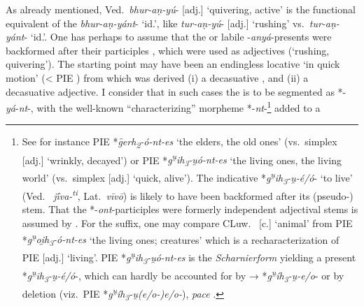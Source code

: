 \documentclass[output=paper,colorlinks,citecolor=brown]{langscibook}
\begin{document}
As already mentioned, Ved.\ \textit{bhur-aṇ-yú}-  [adj.] ‘quivering, active’ is the functional equivalent of the  \textit{bhur-aṇ-yánt}-  ‘id.’, like \textit{tur-aṇ-yú}-  [adj.] ‘rushing’ vs.\ \textit{tur-aṇ-yánt}-  ‘id.’. One has perhaps to assume that the  or labile -\textit{anyá}-presents  were backformed  after their participles , which were used as adjectives (‘rushing, quivering’). The starting point may have been an endingless locative  ‘in quick motion’ (< PIE ) from which was derived (i) a decasuative , and (ii) a decasuative adjective. I consider that in such cases the  is to be segmented as *-\textit{yá}-\textit{nt}-, with the well-known “characterizing” morpheme *-\textit{nt}-\footnote{See for instance PIE *\textit{g̑erh\textsubscript{2}-ó-nt-es}  ‘the elders, the old ones’ (vs.\ simplex  [adj.] ‘wrinkly, decayed’) or PIE *\textit{g\textsuperscript{u̯}ih\textsubscript{3}-u̯ó-nt-es}  ‘the living ones, the living world’ (vs.\ simplex  [adj.] ‘quick, alive’). The indicative  *\textit{g\textsuperscript{u̯}ih\textsubscript{3}-u̯-é/ó}- ‘to live’ (Ved.\  \textit{jī́va-\textsuperscript{ti}}, Lat.\ \textit{vīvō}) is likely to have been backformed  after its (pseudo-) stem. That the *-\textit{ont}-participles were formerly independent adjectival stems is assumed by \citet{Melchert2017}. For the suffix, one may compare CLuw.\  [c.] ‘animal’ from PIE  *\textit{g\textsuperscript{u̯}oi̯h\textsubscript{3}-ó-nt-es}  ‘the living ones; creatures’ which is a recharacterization of PIE   [adj.] ‘living’. PIE *\textit{g\textsuperscript{u̯}ih\textsubscript{3}-u̯ó-nt-es}  is the \textit{Scharnierform} yielding a present  *\textit{g\textsuperscript{u̯}ih\textsubscript{3}-u̯-é/ó}-, which can hardly be accounted for by   → *\textit{g\textsuperscript{u̯}íh\textsubscript{3}-u̯-e/o}- or by deletion (viz.\ PIE *\textit{g\textsuperscript{u̯}íh\textsubscript{3}-u̯(e/o-)e/o-}), \textit{pace} \citet[273--274]{VillanuevaSvensson2021}.} added to a 
\end{document}
